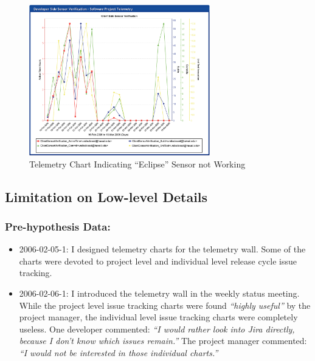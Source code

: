 \begin{figure}[p]
  \center
  \includegraphics[width=0.70\textwidth]{figures/CSDL-DeveloperSensorVerification}
  \caption{Telemetry Chart Indicating ``Eclipse'' Sensor not Working} 
  \label{fig:CSDL-DeveloperSensorVerification}
\end{figure}











\clearpage
\subsection{Limitation on Low-level Details}
\label{EvaluationInCSDL:EventsDescription:Limitation}

\subsubsection{Pre-hypothesis Data:}
\begin{itemize}
  \setlength{\itemsep}{0pt}
  \setlength{\parskip}{0pt}
  \item 2006-02-05-1: I designed telemetry charts for the telemetry wall. Some of the charts were devoted to project level and individual level release cycle issue tracking. 
  \item 2006-02-06-1: I introduced the telemetry wall in the weekly status meeting. While the project level issue tracking charts were found \textit{``highly useful''} by the project manager, the individual level issue tracking charts were completely useless. One developer commented: \textit{``I would rather look into \textit{Jira} directly, because I don't know which issues remain.''} The project manager commented: \textit{``I would not be interested in those individual charts.''}
\end{itemize}

